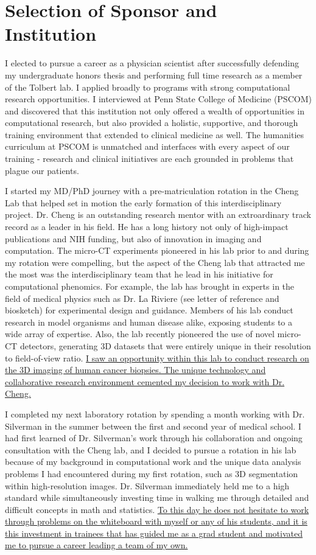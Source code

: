 \documentclass{NIHGrant}
\begin{document}
\part*{Selection of Sponsor and Institution}
I elected to pursue a career as a physician scientist after successfully defending my undergraduate honors thesis and performing full time research as a member of the Tolbert lab. I applied broadly to programs with strong computational research opportunities. I interviewed at Penn State College of Medicine (PSCOM) and discovered that this institution not only offered a wealth of opportunities in computational research, but also provided a holistic, supportive, and thorough training environment that extended to clinical medicine as well. The humanities curriculum at PSCOM is unmatched and interfaces with every aspect of our training - research and clinical initiatives are each grounded in problems that plague our patients.

I started my MD/PhD journey with a pre-matriculation rotation in the Cheng Lab that helped set in motion the early formation of this interdisciplinary project. Dr. Cheng is an outstanding research mentor with an extroardinary track record as a leader in his field. He has a long history not only of high-impact publications and NIH funding, but also of innovation in imaging and computation. The micro-CT experiments pioneered in his lab prior to and during my rotation were compelling, but the aspect of the Cheng lab that attracted me the most was the interdisciplinary team that he lead in his initiative for computational phenomics. For example, the lab has brought in experts in the field of medical physics such as Dr. La Riviere (see letter of reference and biosketch) for experimental design and guidance. Members of his lab conduct research in model organisms and human disease alike, exposing students to a wide array of expertise. Also, the lab recently pioneered the use of novel micro-CT detectors, generating 3D datasets that were entirely unique in their resolution to field-of-view ratio. \uline{I saw an opportunity within this lab to conduct research on the 3D imaging of human cancer biopsies. The unique technology and collaborative research environment cemented my decision to work with Dr. Cheng.}

I completed my next laboratory rotation by spending a month working with Dr. Silverman in the summer between the first and second year of medical school. I had first learned of Dr. Silverman's work through his collaboration and ongoing consultation with the Cheng lab, and I decided to pursue a rotation in his lab because of my background in computational work and the unique data analysis problems I had encountered during my first rotation, such as 3D segmentation within high-resolution images. Dr. Silverman immediately held me to a high standard while simultaneously investing time in walking me through detailed and difficult concepts in math and statistics. \uline{To this day he does not hesitate to work through problems on the whiteboard with myself or any of his students, and it is this investment in trainees that has guided me as a grad student and motivated me to pursue a career leading a team of my own.}
\end{document}
